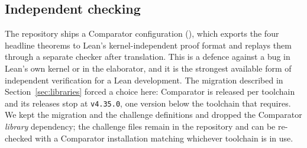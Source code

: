 \subsection{Independent checking}
\label{sec:comparator}

The repository ships a Comparator configuration (), which
exports the four headline theorems to Lean's kernel-independent proof format and replays
them through a separate checker after translation. This is a defence against a bug in
Lean's own kernel or in the elaborator, and it is the strongest available form of
independent verification for a Lean development. The migration described in
Section~\ref{sec:libraries} forced a choice here: Comparator is released per toolchain and
its releases stop at \Lean{} \texttt{v4.35.0}, one version below the toolchain that
\TauCeti{} requires. We kept the migration and the challenge definitions and dropped the
Comparator \emph{library} dependency; the challenge files remain in the repository and can
be re-checked with a Comparator installation matching whichever toolchain is in use.
